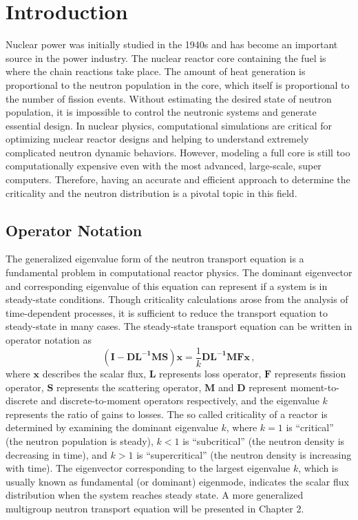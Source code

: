 \cleardoublepage

\chapter{Introduction}
\label{chapter:intro}
Nuclear power was initially studied in the 1940s and has become an important source in the power industry.
The nuclear reactor core containing the fuel is where the chain reactions take place.
The amount of heat generation is proportional to the neutron population in the core, which itself is proportional to the number of fission events. 
Without estimating the desired state of neutron population, it is impossible to control the neutronic systems and generate essential design. 
In nuclear physics, computational simulations are critical for optimizing nuclear reactor designs and helping to understand extremely complicated neutron dynamic behaviors.
However, modeling a full core is still too computationally expensive even with the most advanced, large-scale, super computers. 
Therefore, having an accurate and efficient approach to determine the criticality and the neutron distribution is a pivotal topic in this field.

\section{Operator Notation}
The generalized eigenvalue form of the neutron transport equation is a fundamental problem in computational reactor physics.
The dominant eigenvector and corresponding eigenvalue of this equation can represent if a system is in steady-state conditions.
Though criticality calculations arose from the analysis of time-dependent processes, it is sufficient to reduce the transport equation to steady-state in many cases. 
The steady-state transport equation can be written in operator notation as
\begin{equation}
 \mathbf{(I - DL^{-1}MS)} \mathbf{\mathbf{x}} = \frac{1}{k} \mathbf{DL^{-1}MF} \mathbf{\mathbf{x}}  \, ,
 \label{eq:keig}
\end{equation}
where $\mathbf{\mathbf{x}} $ describes the scalar flux, $\mathbf{L}$ represents loss operator,  $\mathbf{F}$ represents fission operator, $\mathbf{S}$ represents the scattering operator, $\mathbf{M}$ and $\mathbf{D}$ represent moment-to-discrete and discrete-to-moment operators respectively, and the eigenvalue $k$ represents the ratio of gains to losses.
The so called criticality of a reactor is determined by examining the dominant eigenvalue $k$, where $k=1$ is ``critical'' (the neutron population is steady), $k<1$ is ``subcritical'' (the neutron density is decreasing in time), and $k > 1$ is ``supercritical'' (the neutron density is increasing with time).
The eigenvector corresponding to the largest eigenvalue $k$, which is usually known as fundamental (or dominant) eigenmode, indicates the scalar flux distribution when the system reaches steady state.
A more generalized multigroup neutron transport equation will be presented in Chapter 2.

